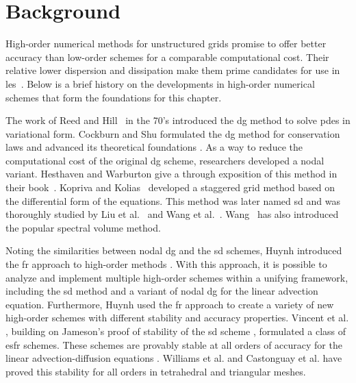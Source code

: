 \section{Background} 
High-order numerical methods for unstructured grids promise to offer better accuracy than low-order schemes for a comparable computational cost. Their relative lower dispersion and dissipation make them prime candidates for use in \gls{les}~\cite{lodato2014structural}. Below is a brief history on the developments in high-order numerical schemes that form the foundations for this chapter.

The work of Reed and Hill~\cite{reed73} in the 70's introduced the \gls{dg} method to solve \gls{pde}s in variational form. Cockburn and Shu formulated the \gls{dg} method for conservation laws and advanced its theoretical foundations \cite{cockburn1989tvbII,cockburn1989tvbIII,cockburn1990rungeIV,cockburn1989runge,cockburn2001runge}. As a way to reduce the computational cost of the original \gls{dg} scheme, researchers developed a nodal variant. Hesthaven and Warburton give a through exposition of this method in their book~\cite{hesthaven2007nodal}. Kopriva and Kolias~\cite{Kopriva96} developed a staggered grid method based on the differential form of the equations. This method was later named \gls{sd} and was thoroughly studied by Liu et al.~\cite{liu2006discontinuous} and Wang et al.~\cite{wang2007spectral}. Wang~\cite{wang2002spectral} has also introduced the popular spectral volume method.

Noting the similarities between nodal \gls{dg} and the \gls{sd} schemes, Huynh introduced the \gls{fr} approach to high-order methods \cite{huynh2007flux,huynh2009reconstruction}. With this approach, it is possible to analyze and implement multiple high-order schemes within a unifying framework, including the \gls{sd} method and a variant of nodal \gls{dg} for the linear advection equation. Furthermore, Huynh used the \gls{fr} approach to create a variety of new high-order schemes with different stability and accuracy properties. Vincent et al. \cite{vincent2011new}, building on Jameson's proof of stability of the \gls{sd} scheme \cite{jameson2010proof}, formulated a class of \gls{esfr} schemes. These schemes are provably stable at all orders of accuracy for the linear advection-diffusion equations \cite{castonguay2013energy}. Williams et al. and Castonguay et al. have proved this stability for all orders in tetrahedral \cite{williams2013tet} and triangular \cite{castonguay2012new,williams2013tri} meshes.

